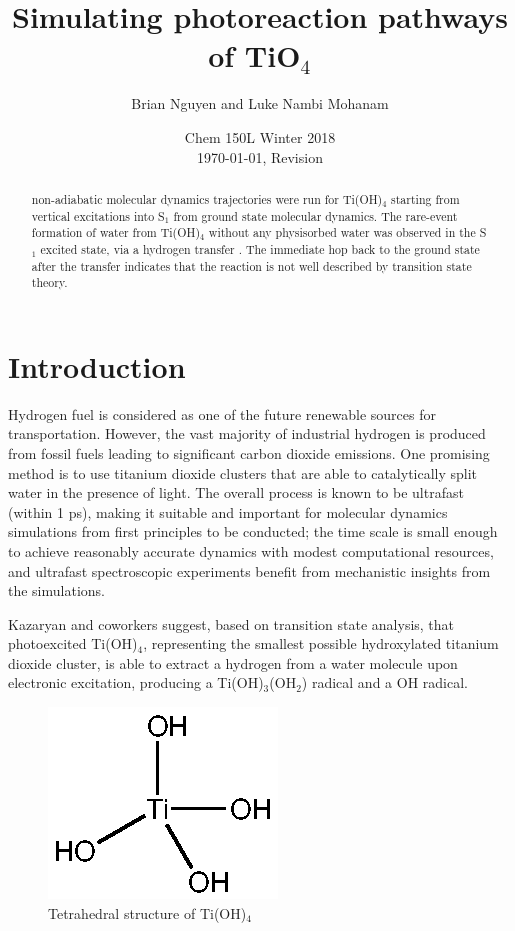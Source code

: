 \documentclass[11pt]{article}
\title{\textbf{Simulating photoreaction pathways of TiO$_4$}}
\author{Brian Nguyen and Luke Nambi Mohanam}
\date{Chem 150L Winter 2018 \\ \today, Revision \Revision}
\begin{document}
\maketitle

\begin{abstract}
   non-adiabatic molecular dynamics trajectories were run for
Ti(OH)$_4$ starting from vertical excitations into S$_1$ from
ground state molecular dynamics. The rare-event formation of
water from Ti(OH)$_4$ without any physisorbed water was
observed in the S$_1$ excited state, via a hydrogen transfer
. The immediate hop back to the ground state after the transfer 
indicates that the reaction is not well described by transition
state theory.
\end{abstract}

\section{Introduction}

Hydrogen fuel is considered as one of the future renewable sources
for transportation. However, the vast majority of industrial hydrogen
is produced from fossil fuels leading to significant carbon dioxide
emissions\cite{NI2007401}. One promising method is to use titanium dioxide
clusters that are able to catalytically split water in the presence of
light. The overall process is known to be ultrafast (within 1 ps),
making it suitable and important for molecular dynamics simulations
from first principles to be conducted; the time scale is small enough
to achieve reasonably accurate dynamics with modest computational
resources, and  ultrafast spectroscopic experiments benefit from
mechanistic insights from the simulations. 

Kazaryan and coworkers
suggest, based on transition state analysis, that photoexcited
Ti(OH)$_4$, representing the smallest possible hydroxylated 
titanium dioxide cluster, is able to extract a hydrogen from a
water molecule upon electronic excitation, producing 
a Ti(OH)$_3$(OH$_2$) radical and a OH radical.\cite{C5CP01812A}

\begin{figure}[H]
  \centering
  \includegraphics[scale=1.0]{tio4h4.eps}
  \caption{Tetrahedral structure of Ti(OH)$_4$}
  \label{fig:tio4h4}
\end{figure}
\end{document}
